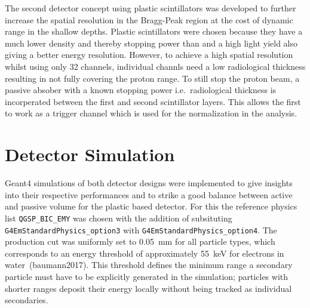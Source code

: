 The second detector concept using plastic scintillators was developed to further increase the spatial resolution in the Bragg-Peak region at the cost of dynamic range in the shallow depths. 
Plastic scintillators were chosen because they have a much lower density and thereby stopping power than  and a high light yield also giving a better energy resolution.
However, to achieve a high spatial resolution whilst using only 32 channels, individual channls need a low radiological thickness resulting in not fully covering the proton range.
To still stop the proton beam, a passive absober with a known stopping power i.e.~radiological thickness is incorperated between the first and second scintillator layers.
This allows the first to work as a trigger channel which is used for the normalization in the analysis.

\section{Detector Simulation}
Geant4 simulations of both detector designs were implemented to give insights into their respective performances and to strike a good balance between active and passive volume for the plastic based detector.
For this the reference physics list \texttt{QGSP\_BIC\_EMY} was chosen with the addition of subsituting \texttt{G4EmStandardPhysics\_option3} with \texttt{G4EmStandardPhysics\_option4}.
The production cut was uniformly set to \SI{0.05}{\milli\meter} for all particle types, which corresponds to an energy threshold of approximately \SI{55}{\kilo\electronvolt} for electrons in water~\cite{}(baumann2017). This threshold defines the minimum range a secondary particle must have to be explicitly generated in the simulation; particles with shorter ranges deposit their energy locally without being tracked as individual secondaries.

